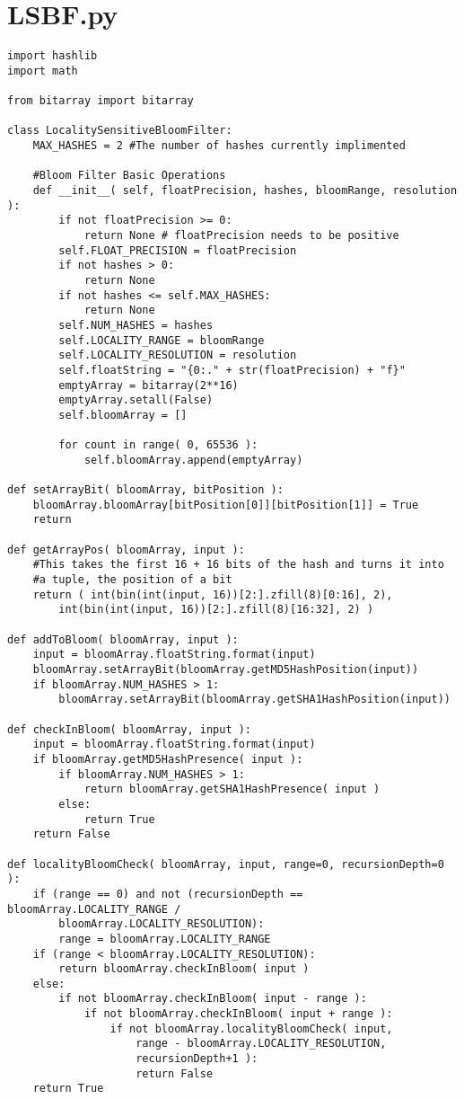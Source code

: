 \chapter{LSBF.py}
\lstset{language=Python, tabsize=3}
\begin{lstlisting}
import hashlib
import math

from bitarray import bitarray

class LocalitySensitiveBloomFilter:
	MAX_HASHES = 2 #The number of hashes currently implimented

	#Bloom Filter Basic Operations
	def __init__( self, floatPrecision, hashes,	bloomRange, resolution ):
		if not floatPrecision >= 0:
			return None # floatPrecision needs to be positive
		self.FLOAT_PRECISION = floatPrecision
		if not hashes > 0:
			return None
		if not hashes <= self.MAX_HASHES:
			return None
		self.NUM_HASHES = hashes
		self.LOCALITY_RANGE = bloomRange
		self.LOCALITY_RESOLUTION = resolution
		self.floatString = "{0:." + str(floatPrecision) + "f}"
		emptyArray = bitarray(2**16)
		emptyArray.setall(False)
		self.bloomArray = []

		for count in range( 0, 65536 ):
			self.bloomArray.append(emptyArray)

def setArrayBit( bloomArray, bitPosition ):
	bloomArray.bloomArray[bitPosition[0]][bitPosition[1]] = True
	return

def getArrayPos( bloomArray, input ):
	#This takes the first 16 + 16 bits of the hash and turns it into
	#a tuple, the position of a bit
	return ( int(bin(int(input, 16))[2:].zfill(8)[0:16], 2),
		int(bin(int(input, 16))[2:].zfill(8)[16:32], 2) )

def addToBloom( bloomArray, input ):
	input = bloomArray.floatString.format(input)
	bloomArray.setArrayBit(bloomArray.getMD5HashPosition(input))
	if bloomArray.NUM_HASHES > 1:
		bloomArray.setArrayBit(bloomArray.getSHA1HashPosition(input))

def checkInBloom( bloomArray, input ):
	input = bloomArray.floatString.format(input)
	if bloomArray.getMD5HashPresence( input ):
		if bloomArray.NUM_HASHES > 1:
			return bloomArray.getSHA1HashPresence( input )
		else:
			return True
	return False

def localityBloomCheck( bloomArray, input, range=0, recursionDepth=0 ):
	if (range == 0) and not (recursionDepth == bloomArray.LOCALITY_RANGE / 
		bloomArray.LOCALITY_RESOLUTION):
		range = bloomArray.LOCALITY_RANGE
	if (range < bloomArray.LOCALITY_RESOLUTION):
		return bloomArray.checkInBloom( input )
	else:
		if not bloomArray.checkInBloom( input - range ):
			if not bloomArray.checkInBloom( input + range ):
				if not bloomArray.localityBloomCheck( input,
					range - bloomArray.LOCALITY_RESOLUTION,
					recursionDepth+1 ):
					return False
	return True


\end{lstlisting}
